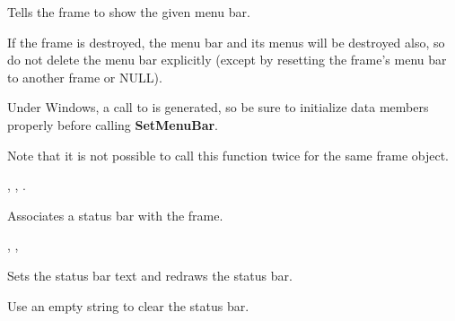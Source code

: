 \label{wxframesetmenubar}


Tells the frame to show the given menu bar.




If the frame is destroyed, the
menu bar and its menus will be destroyed also, so do not delete the menu
bar explicitly (except by resetting the frame's menu bar to another
frame or NULL).

Under Windows, a call to  is generated, so be sure to initialize
data members properly before calling {\bf SetMenuBar}.

Note that it is not possible to call this function twice for the same frame object.


, , .

\label{wxframesetstatusbar}


Associates a status bar with the frame.


, ,\rtfsp
{}

\label{wxframesetstatustext}


Sets the status bar text and redraws the status bar.





Use an empty string to clear the status bar.


